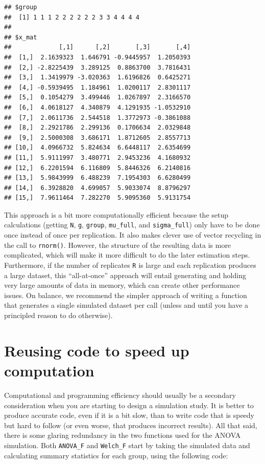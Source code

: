 \documentclass[
]{book}
\begin{document}
\begin{verbatim}
## $group
##  [1] 1 1 1 2 2 2 2 2 2 3 3 4 4 4 4
## 
## $x_mat
##             [,1]      [,2]       [,3]       [,4]
##  [1,]  2.1639323  1.646791 -0.9445957  1.2050393
##  [2,] -2.8225439  3.289125  0.8863700  3.7816431
##  [3,]  1.3419979 -3.020363  1.6196826  0.6425271
##  [4,] -0.5939495  1.184961  1.0200117  2.8301117
##  [5,]  0.1054279  3.499446  1.0267897  2.3166570
##  [6,]  4.0618127  4.340879  4.1291935 -1.0532910
##  [7,]  2.0611736  2.544518  1.3772973 -0.3861088
##  [8,]  2.2921786  2.299136  0.1706634  2.0329848
##  [9,]  2.5000308  3.686171  1.8712605  2.8557713
## [10,]  4.0966732  5.824634  6.6448117  2.6354699
## [11,]  5.9111997  3.480771  2.9453236  4.1680932
## [12,]  6.2201594  6.116809  5.8446326  6.2140816
## [13,]  5.9843999  6.488239  7.1954303  6.6280499
## [14,]  6.3928820  4.699057  5.9033074  8.8796297
## [15,]  7.9611464  7.282270  5.9095360  5.9131754
\end{verbatim}

This approach is a bit more computationally efficient because the setup calculations (getting \texttt{N}, \texttt{g}, \texttt{group}, \texttt{mu\_full}, and \texttt{sigma\_full}) only have to be done once instead of once per replication. It also makes clever use of vector recycling in the call to \texttt{rnorm()}. However, the structure of the resulting data is more complicated, which will make it more difficult to do the later estimation steps.
Furthermore, if the number of replicates \texttt{R} is large and each replication produces a large dataset, this ``all-at-once'' approach will entail generating and holding very large amounts of data in memory, which can create other performance issues.
On balance, we recommend the simpler approach of writing a function that generates a single simulated dataset per call (unless and until you have a principled reason to do otherwise).

\section{Reusing code to speed up computation}\label{reusing-code-to-speed-up-computation}

Computational and programming efficiency should usually be a secondary consideration when you are starting to design a simulation study.
It is better to produce accurate code, even if it is a bit slow, than to write code that is speedy but hard to follow (or even worse, that produces incorrect results).
All that said, there is some glaring redundancy in the two functions used for the ANOVA simulation.
Both \texttt{ANOVA\_F} and \texttt{Welch\_F} start by taking the simulated data and calculating summary statistics for each group, using the following code:
\end{document}
